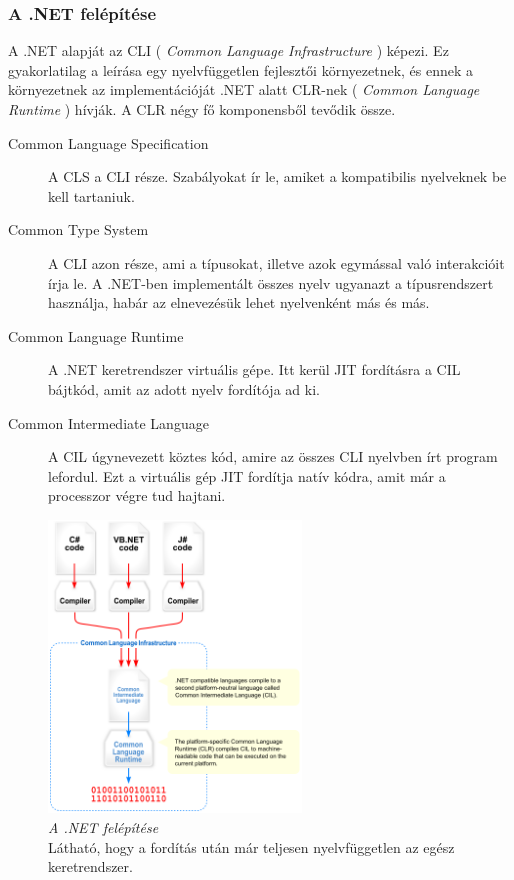 \documentclass[a4paper,12pt]{report}
\begin{document}
\subsubsection{A .NET felépítése}
A .NET alapját az CLI ( \textit{Common Language Infrastructure} ) képezi. Ez gyakorlatilag a leírása egy nyelvfüggetlen fejlesztői környezetnek, és ennek a környezetnek az implementációját .NET alatt CLR-nek ( \textit{Common Language Runtime} ) hívják. A CLR négy fő komponensből tevődik össze.

\begin{description}

    \item[Common Language Specification] A CLS a CLI része. Szabályokat ír le, amiket a kompatibilis nyelveknek be kell tartaniuk.
    \item[Common Type System] A CLI azon része, ami a típusokat, illetve azok egymással való interakcióit írja le. A .NET-ben implementált összes nyelv ugyanazt a típusrendszert használja, habár az elnevezésük lehet nyelvenként más és más.
    \item[Common Language Runtime] A .NET keretrendszer virtuális gépe. Itt kerül JIT fordításra a CIL bájtkód, amit az adott nyelv fordítója ad ki.
    \item[Common Intermediate Language] A CIL úgynevezett köztes kód, amire az összes CLI nyelvben írt program lefordul. Ezt a virtuális gép JIT fordítja natív kódra, amit már a processzor végre tud hajtani.


\end{description}

\begin{figure}
  \caption{\textit{A .NET felépítése} \\ Látható, hogy a fordítás után már teljesen nyelvfüggetlen az egész keretrendszer.}
  \centering
    \includegraphics[width=0.6\textwidth]{images/dotnetinfrastructure.png}
\end{figure}
\end{document}
